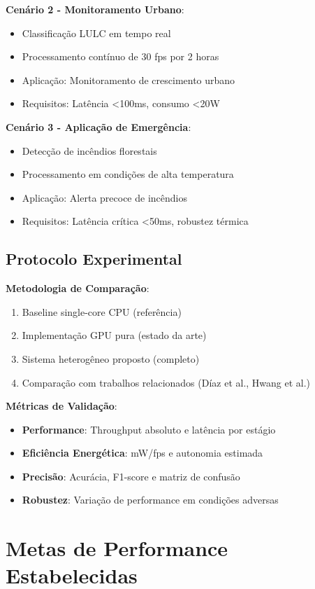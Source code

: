 \textbf{Cenário 2 - Monitoramento Urbano}:
\begin{itemize}
\item Classificação LULC em tempo real
\item Processamento contínuo de 30 fps por 2 horas
\item Aplicação: Monitoramento de crescimento urbano
\item Requisitos: Latência <100ms, consumo <20W
\end{itemize}

\textbf{Cenário 3 - Aplicação de Emergência}:
\begin{itemize}
\item Detecção de incêndios florestais
\item Processamento em condições de alta temperatura
\item Aplicação: Alerta precoce de incêndios
\item Requisitos: Latência crítica <50ms, robustez térmica
\end{itemize}

\subsection{Protocolo Experimental}

\textbf{Metodologia de Comparação}:
\begin{enumerate}
\item Baseline single-core CPU (referência)
\item Implementação GPU pura (estado da arte)
\item Sistema heterogêneo proposto (completo)
\item Comparação com trabalhos relacionados (Díaz et al., Hwang et al.)
\end{enumerate}

\textbf{Métricas de Validação}:
\begin{itemize}
\item \textbf{Performance}: Throughput absoluto e latência por estágio
\item \textbf{Eficiência Energética}: mW/fps e autonomia estimada
\item \textbf{Precisão}: Acurácia, F1-score e matriz de confusão
\item \textbf{Robustez}: Variação de performance em condições adversas
\end{itemize}

\section{Metas de Performance Estabelecidas}

